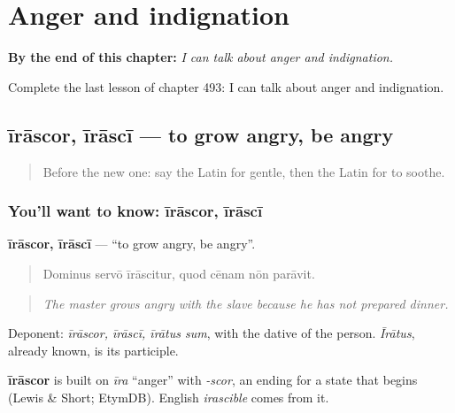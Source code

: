 
\chapter{Anger and indignation}
\label{ch:la-anger-and-indignation}

\begin{chapteropening}
\textbf{By the end of this chapter:} \emph{I can talk about anger and indignation.}

Complete the last lesson of chapter 493: I can talk about anger and indignation.
\end{chapteropening}

\section[īrāscor, īrāscī]{īrāscor, īrāscī — to grow angry, be angry}

\label{lesson:LA-C493-irascor}



\begin{quote}
Before the new one: say the Latin for gentle, then the Latin for to soothe.
\end{quote}

\subsection*{You'll want to know: īrāscor, īrāscī}
\textbf{īrāscor, īrāscī} — \textquotedblleft{}to grow angry, be angry\textquotedblright{}.

\begin{quote}
Dominus servō īrāscitur, quod cēnam nōn parāvit.
\end{quote}

\begin{quote}
\emph{The master grows angry with the slave because he has not prepared dinner.}
\end{quote}

Deponent: \emph{īrāscor, īrāscī, īrātus sum}, with the dative of the person. \emph{Īrātus}, already known, is its participle.

\begin{cousinweb}
\textbf{īrāscor} is built on \emph{īra} \textquotedblleft{}anger\textquotedblright{} with \emph{-scor}, an ending for a state that begins (Lewis \& Short; EtymDB). English \emph{irascible} comes from it.
\end{cousinweb}

